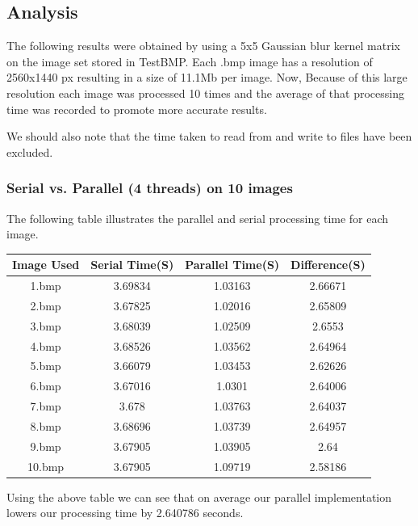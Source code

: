 \documentclass[paper=a4, fontsize=11pt]{scrartcl} %
\numberwithin{equation}{section} %
\numberwithin{figure}{section} %
\numberwithin{table}{section} %
\begin{document}
\subsection{Analysis}
The following results were obtained by using a 5x5 Gaussian blur kernel matrix on the image set stored in TestBMP.
Each .bmp image has a resolution of 2560x1440 px resulting in a size of 11.1Mb per image. Now, Because of this large resolution each image was processed 10 times and the average of that processing time was recorded to promote more accurate results.


We should also note that the time taken to read from and write to files have been excluded.


\subsubsection{Serial vs. Parallel (4 threads) on 10 images}
The following table illustrates the parallel and serial processing time for each image.

\begin{center}

\begin{tabular}{||c |c |c |c ||}
\hline
\textbf{Image Used} & \textbf{Serial Time(S)} & \textbf{Parallel Time(S)} & \textbf{Difference(S)} \\[0.5ex]
\hline \hline

1.bmp & 3.69834 & 1.03163 & 2.66671 \\
2.bmp & 3.67825 & 1.02016 & 2.65809\\
3.bmp & 3.68039 & 1.02509 & 2.6553\\
4.bmp & 3.68526 & 1.03562 & 2.64964\\
5.bmp & 3.66079 & 1.03453 & 2.62626\\
6.bmp & 3.67016 & 1.0301 & 2.64006\\
7.bmp & 3.678 & 1.03763 & 2.64037\\
8.bmp & 3.68696 & 1.03739  & 2.64957\\
9.bmp & 3.67905 & 1.03905 & 2.64\\
10.bmp & 3.67905 & 1.09719 & 2.58186\\[1ex]

\hline

\end{tabular}

\end{center}

Using the above table we can see that on average our parallel implementation lowers our processing time by 2.640786 seconds.
\end{document}
